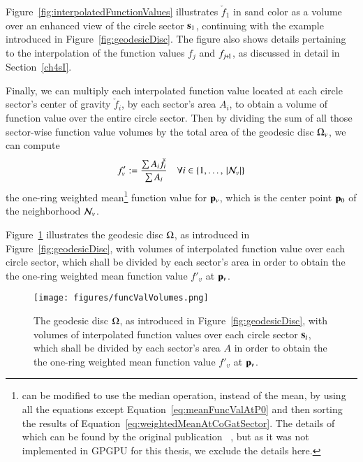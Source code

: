 Figure~\ref{fig:interpolatedFunctionValues} illustrates $\check{f}_1$ in sand color as a volume over an enhanced view of the circle sector $\mathbf{s}_1$, continuing with the example introduced in Figure~\ref{fig:geodesicDisc}. The figure also shows details pertaining to the interpolation of the function values $f_j$ and $f_{\sjpo}$, as discussed in detail in Section~\ref{ch4sI}.


Finally, we can multiply each interpolated function value located at each circle sector's center of gravity $\check{f}_i$, by each sector's area $A_i$, to obtain a volume of function value over the entire circle sector. Then by dividing the sum of all those sector-wise function value volumes by the total area of the geodesic disc $\Omega_v$, we can compute
\begin{equation}
	f'_v := \frac{\sum A_i\check{f}_i}{\sum A_i} \quad \forall i \in \{1,\ldots,\,|\mathcal{N}_v|\}
	\label{eq:meanFuncValAtPv}
\end{equation}%
%
the one-ring weighted mean\footnote{ can be modified to use the median operation, instead of the mean, by using all the equations except Equation~\ref{eq:meanFuncValAtP0} and then sorting the results of Equation~\ref{eq:weightedMeanAtCoGatSector}. The details of which can be found by the original publication ~\cite[s.~3.2]{Mara17}, but as it was not implemented in GPGPU for this thesis, we exclude the details here.} function value for $\bp_v$, which is the center point $\mathbf{p}_0$ of the neighborhood $\mathcal{N}_v$.

Figure~\ref{fig:funcValVolumes} illustrates the geodesic disc $\Omega$, as introduced in Figure~\ref{fig:geodesicDisc}, with volumes of interpolated function value over each circle sector, which shall be divided by each sector's area in order to obtain the the one-ring weighted mean function value $f'_v$ at $\bp_v$.
\begin{figure}[ht]
\ffigbox
	{\texttt{[image: figures/funcValVolumes.png]}}
	{\caption[Weighted Mean Function Value $f'_v$at $\bp_v$]{The geodesic disc $\Omega$, as introduced in Figure~\ref{fig:geodesicDisc}, with volumes of interpolated function values over each circle sector $\mathbf{s}_i$, which shall be divided by each sector's area $A$ in order to obtain the the one-ring weighted mean function value $f'_v$ at $\bp_v$.}\label{fig:funcValVolumes}}
\end{figure}

